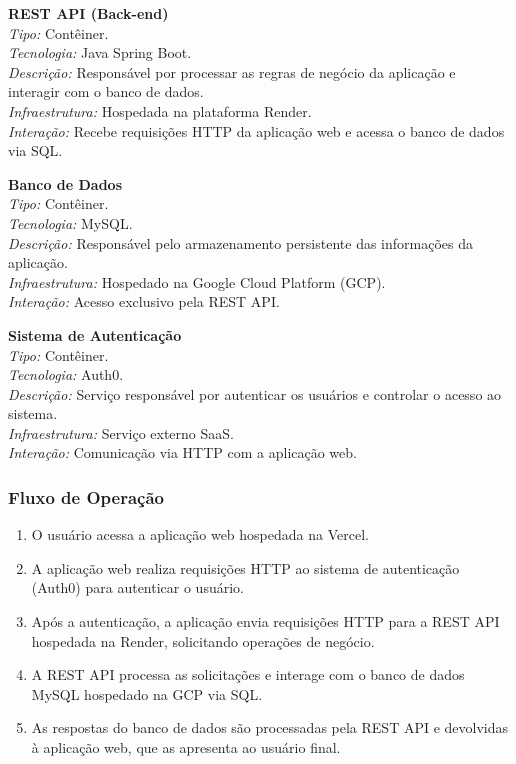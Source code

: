 \documentclass[
	article,			%
	12pt,				%
	oneside,			%
	a4paper,			%
    BIBLATEX,           %
	english,			%
	brazil,				%
	sumario=tradicional
	]{abntex2}
\begin{document}
\textbf{REST API (Back-end)}\\
\textit{Tipo:} Contêiner.\\
\textit{Tecnologia:} Java Spring Boot.\\
\textit{Descrição:} Responsável por processar as regras de negócio da aplicação e interagir com o banco de dados.\\
\textit{Infraestrutura:} Hospedada na plataforma Render.\\
\textit{Interação:} Recebe requisições HTTP da aplicação web e acessa o banco de dados via SQL.

\textbf{Banco de Dados}\\
\textit{Tipo:} Contêiner.\\
\textit{Tecnologia:} MySQL.\\
\textit{Descrição:} Responsável pelo armazenamento persistente das informações da aplicação.\\
\textit{Infraestrutura:} Hospedado na Google Cloud Platform (GCP).\\
\textit{Interação:} Acesso exclusivo pela REST API.

\textbf{Sistema de Autenticação}\\
\textit{Tipo:} Contêiner.\\
\textit{Tecnologia:} Auth0.\\
\textit{Descrição:} Serviço responsável por autenticar os usuários e controlar o acesso ao sistema.\\
\textit{Infraestrutura:} Serviço externo SaaS.\\
\textit{Interação:} Comunicação via HTTP com a aplicação web.

\subsubsection{Fluxo de Operação}

\begin{enumerate}
    \item O usuário acessa a aplicação web hospedada na Vercel.
    \item A aplicação web realiza requisições HTTP ao sistema de autenticação (Auth0) para autenticar o usuário.
    \item Após a autenticação, a aplicação envia requisições HTTP para a REST API hospedada na Render, solicitando operações de negócio.
    \item A REST API processa as solicitações e interage com o banco de dados MySQL hospedado na GCP via SQL.
    \item As respostas do banco de dados são processadas pela REST API e devolvidas à aplicação web, que as apresenta ao usuário final.
\end{enumerate}
\end{document}
